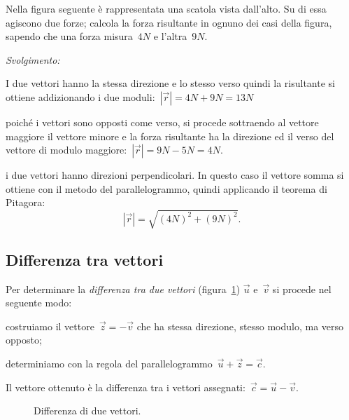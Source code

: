 \begin{esempio}
Nella figura seguente è rappresentata una scatola vista dall'alto. Su di essa 
agiscono due forze; calcola la forza risultante in ognuno dei casi della figura,
sapendo che una forza misura~$4 \unit{N}$ e l'altra~$9 \unit{N}$.
\begin{center}
 
\end{center}
\emph{Svolgimento:}
\begin{enumeratea}
\item I due vettori hanno la stessa direzione e lo stesso verso quindi la 
risultante si ottiene addizionando i due moduli:~$|\vec{r}|=4 \unit{N}+9 
\unit{N}=13 \unit{N}$
\item poiché i vettori sono opposti come verso, si procede sottraendo al 
vettore maggiore il vettore minore e la forza risultante ha la direzione ed il 
verso
del vettore di modulo maggiore:~$|\vec{r}|=9 \unit{N} - 5 \unit{N}=4 \unit{N}$.
\item i due vettori hanno direzioni perpendicolari. In questo caso il vettore 
somma si ottiene con il metodo del parallelogrammo, quindi applicando il 
teorema di Pitagora:
\[|\vec{r}|=\sqrt{(4 \unit{N})^2+(9 \unit{N})^2}.\]
\end{enumeratea}
\end{esempio}

\subsection{Differenza tra vettori}

\begin{procedura} Per determinare la \emph{differenza tra due vettori} 
(figura~\ref{fig:F.11}) $\vec{u}$ e~$\vec{v}$
si procede nel seguente modo:
\begin{enumeratea}
\item costruiamo il vettore~$\vec{z}=-\vec{v}$ che ha stessa direzione, stesso 
modulo, ma verso opposto;
\item determiniamo con la regola del parallelogrammo~$\vec{u}+\vec{z}=\vec{c}$.
\end{enumeratea}
Il vettore ottenuto è la differenza tra i vettori 
assegnati:~$\vec{c}=\vec{u}-\vec{v}$.
\end{procedura}

\begin{inaccessibleblock}
 \begin{figure}[t]
 \centering
 
 \caption{Differenza di due vettori.}
 \label{fig:F.11}
\end{figure}
\end{inaccessibleblock}


